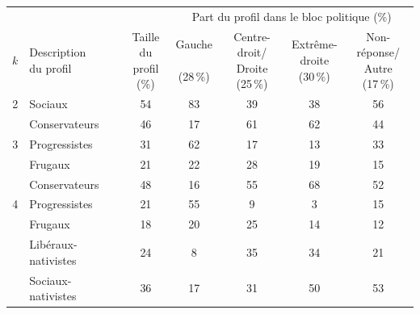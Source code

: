 \begin{tabular}{clccccc}
\toprule
& & & \multicolumn{4}{c}{Part du profil dans le bloc politique (\%)} \\
\cmidrule(lr){4-7}
$k$ & \makecell[l]{Description\\du profil} & \makecell{Taille\\du profil\\(\%)} & \makecell{Gauche\\\quad\\(28\,\%)}  & \makecell{Centre-droit/\\Droite\\(25\,\%)}  & \makecell{Extrême-\\droite\\(30\,\%)}  & \makecell{Non-réponse/\\Autre\\(17\,\%)} 
 \\
\midrule
2 & \cellcolor{mgt!15}Sociaux & \cellcolor{mgt!15}54 & \cellcolor{mgt!15}83 & \cellcolor{mgt!15}39 & \cellcolor{mgt!15}38 & \cellcolor{mgt!15}56
 \\
 & \cellcolor{cdroite!15}Conservateurs & \cellcolor{cdroite!15}46 & \cellcolor{cdroite!15}17 & \cellcolor{cdroite!15}61 & \cellcolor{cdroite!15}62 & \cellcolor{cdroite!15}44
 \\
\midrule
3 & \cellcolor{cleft!15}Progressistes & \cellcolor{cleft!15}31 & \cellcolor{cleft!15}62 & \cellcolor{cleft!15}17 & \cellcolor{cleft!15}13 & \cellcolor{cleft!15}33
 \\
 & \cellcolor{cfrug!15}Frugaux & \cellcolor{cfrug!15}21 & \cellcolor{cfrug!15}22 & \cellcolor{cfrug!15}28 & \cellcolor{cfrug!15}19 & \cellcolor{cfrug!15}15
 \\
 & \cellcolor{cdroite!15}Conservateurs & \cellcolor{cdroite!15}48 & \cellcolor{cdroite!15}16 & \cellcolor{cdroite!15}55 & \cellcolor{cdroite!15}68 & \cellcolor{cdroite!15}52
 \\
\midrule
4 & \cellcolor{cleft!15}Progressistes & \cellcolor{cleft!15}21 & \cellcolor{cleft!15}55 & \cellcolor{cleft!15}9 & \cellcolor{cleft!15}3 & \cellcolor{cleft!15}15
 \\
 & \cellcolor{cfrug!15}Frugaux & \cellcolor{cfrug!15}18 & \cellcolor{cfrug!15}20 & \cellcolor{cfrug!15}25 & \cellcolor{cfrug!15}14 & \cellcolor{cfrug!15}12
 \\
 & \cellcolor{ccdroit!15}Libéraux-nativistes & \cellcolor{ccdroit!15}24 & \cellcolor{ccdroit!15}8 & \cellcolor{ccdroit!15}35 & \cellcolor{ccdroit!15}34 & \cellcolor{ccdroit!15}21
 \\
 & \cellcolor{ced!15}Sociaux-nativistes & \cellcolor{ced!15}36 & \cellcolor{ced!15}17 & \cellcolor{ced!15}31 & \cellcolor{ced!15}50 & \cellcolor{ced!15}53
 \\
\bottomrule
\end{tabular}
